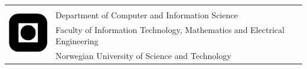 \begin{titlepage}
\begin{center}

\vspace*{2cm}
\Huge{\covertitle\\}
\vspace{1cm}
\LARGE{\subtitle\\}
\vspace{1.5cm}
\Large{\coverauthor\\}
\vspace{1.5cm}
\Large{\coverdate\\}
\end{center}

\vfill
\normalsize

\begin{table}[!h]
\begin{tabular}{ll}
\multirow{4}{*}{\includegraphics[width=20mm]{images/logo}} & \\
& Department of Computer and Information Science \\
& Faculty of Information Technology, Mathematics and Electrical Engineering \\
& Norwegian University of Science and Technology \\
\end{tabular}
\end{table}
\end{titlepage}
